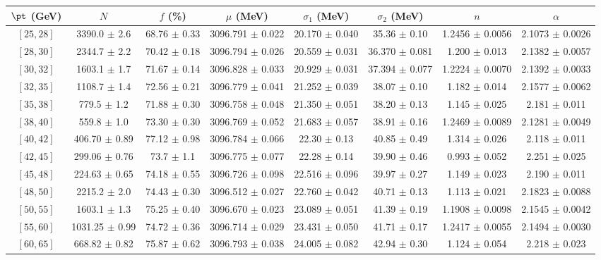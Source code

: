 \begin{tabular}{c||c|c|c|c|c|c|c}
$\pt$ (GeV) & $N$ & $f$ (\%) & $\mu$ (MeV) & $\sigma_1$ (MeV) & $\sigma_2$ (MeV) & $n$ & $\alpha$ \\
\hline
$[25, 28]$ & 3390.0 $\pm$ 2.6 & 68.76 $\pm$ 0.33 & 3096.791 $\pm$ 0.022 & 20.170 $\pm$ 0.040 & 35.36 $\pm$ 0.10 & 1.2456 $\pm$ 0.0056 & 2.1073 $\pm$ 0.0026\\
$[28, 30]$ & 2344.7 $\pm$ 2.2 & 70.42 $\pm$ 0.18 & 3096.794 $\pm$ 0.026 & 20.559 $\pm$ 0.031 & 36.370 $\pm$ 0.081 & 1.200 $\pm$ 0.013 & 2.1382 $\pm$ 0.0057\\
$[30, 32]$ & 1603.1 $\pm$ 1.7 & 71.67 $\pm$ 0.14 & 3096.828 $\pm$ 0.033 & 20.929 $\pm$ 0.031 & 37.394 $\pm$ 0.077 & 1.2224 $\pm$ 0.0070 & 2.1392 $\pm$ 0.0033\\
$[32, 35]$ & 1108.7 $\pm$ 1.4 & 72.56 $\pm$ 0.21 & 3096.779 $\pm$ 0.041 & 21.252 $\pm$ 0.039 & 38.07 $\pm$ 0.10 & 1.182 $\pm$ 0.014 & 2.1577 $\pm$ 0.0062\\
$[35, 38]$ & 779.5 $\pm$ 1.2 & 71.88 $\pm$ 0.30 & 3096.758 $\pm$ 0.048 & 21.350 $\pm$ 0.051 & 38.20 $\pm$ 0.13 & 1.145 $\pm$ 0.025 & 2.181 $\pm$ 0.011\\
$[38, 40]$ & 559.8 $\pm$ 1.0 & 73.30 $\pm$ 0.30 & 3096.769 $\pm$ 0.052 & 21.683 $\pm$ 0.057 & 38.91 $\pm$ 0.16 & 1.2469 $\pm$ 0.0089 & 2.1281 $\pm$ 0.0049\\
$[40, 42]$ & 406.70 $\pm$ 0.89 & 77.12 $\pm$ 0.98 & 3096.784 $\pm$ 0.066 & 22.30 $\pm$ 0.13 & 40.85 $\pm$ 0.49 & 1.314 $\pm$ 0.026 & 2.118 $\pm$ 0.011\\
$[42, 45]$ & 299.06 $\pm$ 0.76 & 73.7 $\pm$ 1.1 & 3096.775 $\pm$ 0.077 & 22.28 $\pm$ 0.14 & 39.90 $\pm$ 0.46 & 0.993 $\pm$ 0.052 & 2.251 $\pm$ 0.025\\
$[45, 48]$ & 224.63 $\pm$ 0.65 & 74.18 $\pm$ 0.55 & 3096.726 $\pm$ 0.098 & 22.516 $\pm$ 0.096 & 39.97 $\pm$ 0.27 & 1.149 $\pm$ 0.023 & 2.190 $\pm$ 0.011\\
$[48, 50]$ & 2215.2 $\pm$ 2.0 & 74.43 $\pm$ 0.30 & 3096.512 $\pm$ 0.027 & 22.760 $\pm$ 0.042 & 40.71 $\pm$ 0.13 & 1.113 $\pm$ 0.021 & 2.1823 $\pm$ 0.0088\\
$[50, 55]$ & 1603.1 $\pm$ 1.3 & 75.25 $\pm$ 0.40 & 3096.670 $\pm$ 0.023 & 23.089 $\pm$ 0.051 & 41.39 $\pm$ 0.19 & 1.1908 $\pm$ 0.0098 & 2.1545 $\pm$ 0.0042\\
$[55, 60]$ & 1031.25 $\pm$ 0.99 & 74.72 $\pm$ 0.36 & 3096.714 $\pm$ 0.029 & 23.431 $\pm$ 0.050 & 41.71 $\pm$ 0.17 & 1.2417 $\pm$ 0.0055 & 2.1494 $\pm$ 0.0030\\
$[60, 65]$ & 668.82 $\pm$ 0.82 & 75.87 $\pm$ 0.62 & 3096.793 $\pm$ 0.038 & 24.005 $\pm$ 0.082 & 42.94 $\pm$ 0.30 & 1.124 $\pm$ 0.054 & 2.218 $\pm$ 0.023\\

\end{tabular}
